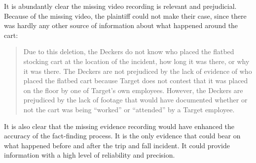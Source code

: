 \documentclass[
  10pt,
  dvipsnames,enabledeprecatedfontcommands]{scrartcl}
\begin{document}
It is abundantly clear the missing video recording is relevant and
prejudicial. Because of the missing video, the plaintiff could not make
their case, since there was hardly any other source of information about
what happened around the cart:

\begin{quote}
Due to this deletion, the Deckers do not know who placed the flatbed stocking cart at the location of the incident, how long it was there, or why it was there. The Deckers are not prejudiced by the lack of evidence of who placed the flatbed cart because Target does not contest that it was placed on the floor by one of Target’s own employees. However, the Deckers are prejudiced by the lack of footage that would have documented  whether or not the cart was being “worked” or “attended” by a Target employee.
\end{quote}

\noindent  It is also clear that the missing evidence recording would
have enhanced the accuracy of the fact-finding process. It is the only
evidence that could bear on what happened before and after the trip and
fall incident. It could provide information with a high level of
reliability and precision.
\end{document}
